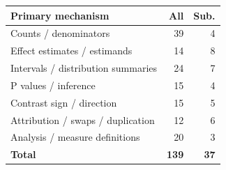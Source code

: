 \begin{tabularx}{\linewidth}{@{}Yrr@{}}
\toprule
Primary mechanism & All & Sub. \\
\midrule
Counts / denominators & 39 & 4 \\
Effect estimates / estimands & 14 & 8 \\
Intervals / distribution summaries & 24 & 7 \\
P values / inference & 15 & 4 \\
Contrast sign / direction & 15 & 5 \\
Attribution / swaps / duplication & 12 & 6 \\
Analysis / measure definitions & 20 & 3 \\
\midrule
\textbf{Total} & \textbf{139} & \textbf{37} \\
\bottomrule
\end{tabularx}
